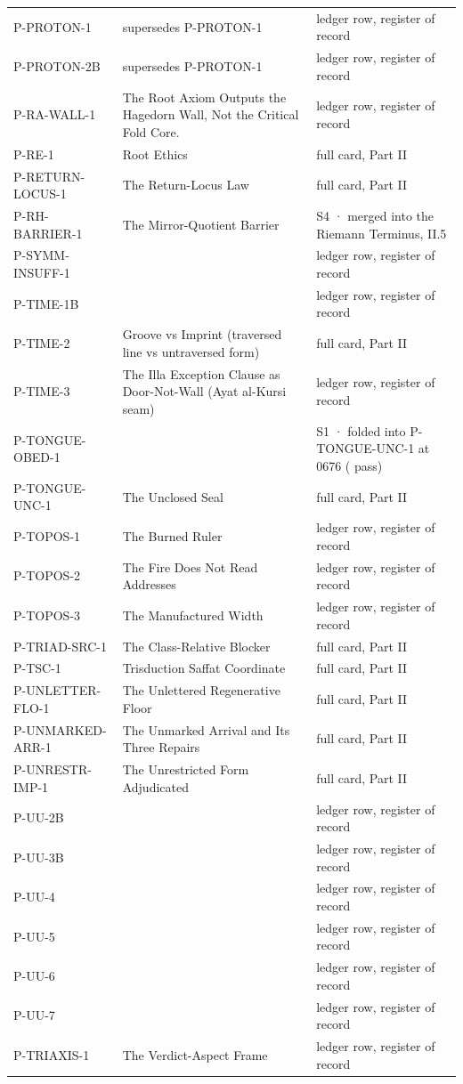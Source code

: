 \documentclass[10pt,twocolumn]{article}
\begin{document}
\begin{center}
\begin{longtable}{>{\raggedright\arraybackslash}p{}>{\raggedright\arraybackslash}p{}>{\raggedright\arraybackslash}p{}}
P-PROTON-1 & supersedes P-PROTON-1 & ledger row, register of record \\
P-PROTON-2B & supersedes P-PROTON-1 & ledger row, register of record \\
P-RA-WALL-1 & The Root Axiom Outputs the Hagedorn Wall, Not the Critical Fold Core. & ledger row, register of record \\
P-RE-1 & Root Ethics & full card, Part II \\
P-RETURN-LOCUS-1 & The Return-Locus Law & full card, Part II \\
P-RH-BARRIER-1 & The Mirror-Quotient Barrier & S4 · merged into the Riemann Terminus, II.5 \\
P-SYMM-INSUFF-1 &  & ledger row, register of record \\
P-TIME-1B &  & ledger row, register of record \\
P-TIME-2 & Groove vs Imprint (traversed line vs untraversed form) & full card, Part II \\
P-TIME-3 & The Illa Exception Clause as Door-Not-Wall (Ayat al-Kursi seam) & ledger row, register of record \\
P-TONGUE-OBED-1 &  & S1 · folded into P-TONGUE-UNC-1 at 0676 ( pass) \\
P-TONGUE-UNC-1 & The Unclosed Seal & full card, Part II \\
P-TOPOS-1 & The Burned Ruler & ledger row, register of record \\
P-TOPOS-2 & The Fire Does Not Read Addresses & ledger row, register of record \\
P-TOPOS-3 & The Manufactured Width & ledger row, register of record \\
P-TRIAD-SRC-1 & The Class-Relative Blocker & full card, Part II \\
P-TSC-1 & Trisduction Saffat Coordinate & full card, Part II \\
P-UNLETTER-FLO-1 & The Unlettered Regenerative Floor & full card, Part II \\
P-UNMARKED-ARR-1 & The Unmarked Arrival and Its Three Repairs & full card, Part II \\
P-UNRESTR-IMP-1 & The Unrestricted Form Adjudicated & full card, Part II \\
P-UU-2B &  & ledger row, register of record \\
P-UU-3B &  & ledger row, register of record \\
P-UU-4 &  & ledger row, register of record \\
P-UU-5 &  & ledger row, register of record \\
P-UU-6 &  & ledger row, register of record \\
P-UU-7 &  & ledger row, register of record \\
P-TRIAXIS-1 & The Verdict-Aspect Frame & ledger row, register of record \\
\end{longtable}
\end{center}
\end{document}
